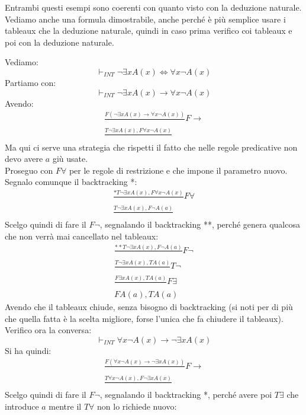 \documentclass[a4paper,12pt, oneside]{book}
\begin{document}
Entrambi questi esempi sono coerenti con quanto visto con la deduzione
naturale.\\
Vediamo anche una formula dimostrabile, anche perché è più semplice usare i
tableaux che la deduzione naturale, quindi in caso prima verifico coi tableaux e
poi con la deduzione naturale.
\begin{esempio}
  Vediamo:
  \[\vdash_{INT} \neg\exists x A(x)\iff \forall x\neg A(x)\]
  Partiamo con:
  \[\vdash_{INT} \neg\exists x A(x)\to \forall x\neg A(x)\]
  Avendo:
  \begin{gather*}
    \frac{F(\neg\exists x A(x)\to \forall x\neg A(x))}{}F\to\\
    \frac{T\neg\exists xA(x), F\forall x\neg A(x)}{}
  \end{gather*}
  Ma qui ci serve una strategia che rispetti il fatto che nelle regole
  predicative non devo avere $a$ giù usate.\\
  Proseguo con $F\forall$ per le regole di restrizione e che impone il parametro
  nuovo. Segnalo comunque il backtracking *:
  \begin{gather*}
    \frac{*T\neg\exists xA(x), F\forall x\neg A(x)}{}F\forall\\
    \frac{T\neg \exists x A(x), F\neg A(a)}{}
  \end{gather*}
  Scelgo quindi di fare il $F\neg$, segnalando il backtracking **, perché genera
  qualcosa che non verrà mai cancellato nel tableaux:
  \begin{gather*}
    \frac{**T\neg \exists x A(x), F\neg A(a)}{}F\neg\\
    \frac{T\neg \exists x A(x), T A(a)}{}T\neg\\
    \frac{F\exists xA(x), TA(a)}{}F\exists\\
    FA(a), TA(a)
  \end{gather*}
  Avendo che il tableaux chiude, senza bisogno di backtracking (si noti per di
  più che quella fatta è la scelta migliore, forse l'unica che fa chiudere il
  tableaux).\\ 
  Verifico ora la conversa:
  \[\vdash_{INT} \forall x\neg A(x)\to \neg\exists x A(x) \]
  Si ha quindi:
  \begin{gather*}
    \frac{F(\forall x\neg A(x)\to \neg\exists x A(x))}{}F\to\\
    \frac{T\forall x\neg A(x), F\neg\exists x A(x)}{}
  \end{gather*}
  Scelgo quindi di fare il $F\neg$, segnalando il backtracking *, perché avere
  poi $T\exists$ che introduce $a$ mentre il $T\forall$ non lo richiede nuovo:

\end{esempio}
\end{document}
